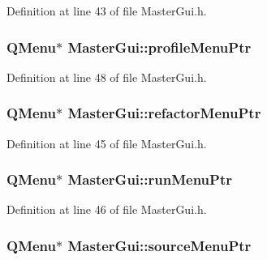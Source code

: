 Definition at line 43 of file Master\-Gui.\-h.

\hypertarget{class_master_gui_a9c0ef6beee1cb9afcfff786bc4c6bd06}{
\subsubsection[{profile\-Menu\-Ptr}]{\setlength{\rightskip}{0pt plus 5cm}Q\-Menu$\ast$ Master\-Gui\-::profile\-Menu\-Ptr\hspace{0.3cm}{\ttfamily [private]}}}\label{class_master_gui_a9c0ef6beee1cb9afcfff786bc4c6bd06}


Definition at line 48 of file Master\-Gui.\-h.

\hypertarget{class_master_gui_a44e789008fcc276a7a4294beb98d02c7}{
\subsubsection[{refactor\-Menu\-Ptr}]{\setlength{\rightskip}{0pt plus 5cm}Q\-Menu$\ast$ Master\-Gui\-::refactor\-Menu\-Ptr\hspace{0.3cm}{\ttfamily [private]}}}\label{class_master_gui_a44e789008fcc276a7a4294beb98d02c7}


Definition at line 45 of file Master\-Gui.\-h.

\hypertarget{class_master_gui_ae5b13b338972e99f29e623d258088b07}{
\subsubsection[{run\-Menu\-Ptr}]{\setlength{\rightskip}{0pt plus 5cm}Q\-Menu$\ast$ Master\-Gui\-::run\-Menu\-Ptr\hspace{0.3cm}{\ttfamily [private]}}}\label{class_master_gui_ae5b13b338972e99f29e623d258088b07}


Definition at line 46 of file Master\-Gui.\-h.

\hypertarget{class_master_gui_a3ffd8337f87c7c6eca6b4740fa8d1c57}{
\subsubsection[{source\-Menu\-Ptr}]{\setlength{\rightskip}{0pt plus 5cm}Q\-Menu$\ast$ Master\-Gui\-::source\-Menu\-Ptr\hspace{0.3cm}{\ttfamily [private]}}}\label{class_master_gui_a3ffd8337f87c7c6eca6b4740fa8d1c57}


